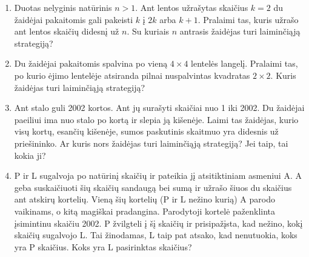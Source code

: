 \begin{enumerate}
\item Duotas nelyginis natūrinis $n>1$. Ant lentos užrašytas skaičius $k=2$ du žaidėjai pakaitomis gali pakeisti $k$ į $2k$ arba $k+1$. Pralaimi tas, kuris užrašo ant lentos skaičių didesnį už $n$. Su kuriais $n$ antrasis žaidėjas turi laiminčiąją strategiją? 


\item  Du žaidėjai pakaitomis spalvina po vieną  $4\times 4$ lentelės langelį. Pralaimi tas, po kurio ėjimo lentelėje atsiranda pilnai nuspalvintas kvadratas  $2\times 2$. Kuris žaidėjas turi laiminčiąją strategiją?


\item Ant stalo guli 2002 kortos. Ant jų surašyti skaičiai nuo 1 iki 2002. Du žaidėjai paeiliui ima nuo stalo po kortą ir slepia ją kišenėje. Laimi tas žaidėjas, kurio visų kortų, esančių kišenėje, sumos paskutinis skaitmuo yra didesnis už priešininko. Ar kuris nors žaidėjas turi laiminčiąją strategiją? Jei taip, tai kokia ji? 


\item P ir L sugalvoja po natūrinį skaičių ir pateikia jį atsitiktiniam asmeniui A. A geba suskaičiuoti šių skaičių sandaugą bei sumą ir užrašo šiuos du skaičius ant atskirų kortelių. Vieną šių kortelių (P ir L nežino kurią) A parodo vaikinams, o kitą magiškai pradangina. Parodytoji kortelė paženklinta įsimintinu skaičiu 2002. P žvilgteli į šį skaičių ir prisipažįsta, kad nežino, kokį skaičių sugalvojo L. Tai žinodamas, L taip pat atsako, kad nenutuokia, koks yra P skaičius. Koks yra L pasirinktas skaičius? 


\end{enumerate}
